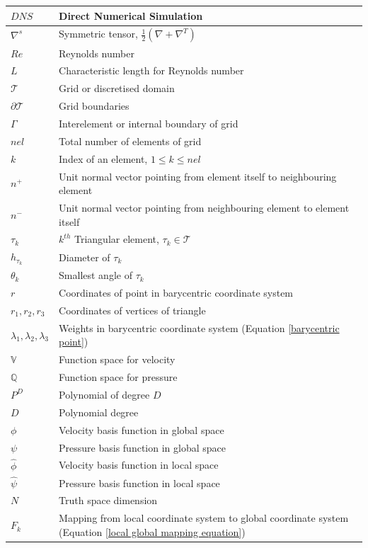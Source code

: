 \documentclass[a4paper,openany]{book}
\begin{document}
\begin{longtable}{| p{} | p{} |}
\hline
$DNS$ & Direct Numerical Simulation\\
\hline
$\nabla^s$ & Symmetric tensor, $\frac{1}{2} (\nabla + \nabla^T)$\\
\hline
$Re$ & Reynolds number\\
\hline
$L$ & Characteristic length for Reynolds number\\
\hline
$\mathcal{T}$ & Grid or discretised domain\\
\hline
$\partial \mathcal{T}$ & Grid boundaries\\
\hline
$\Gamma$ & Interelement or internal boundary of grid\\
\hline
$nel$ & Total number of elements of grid\\
\hline
$k$ & Index of an element, $1\leq k \leq nel$\\
\hline
$n^+$ & Unit normal vector pointing from element itself to neighbouring element\\
\hline
$n^-$ & Unit normal vector pointing from neighbouring element to element itself \\
\hline
$\tau_k$ & $k^{th}$ Triangular element, $\tau_k \in \mathcal{T}$\\
\hline
$h_{\tau_k}$ & Diameter of $\tau_k$\\
\hline
$\theta_k$ & Smallest angle of $\tau_k$\\ 
\hline
$r$ & Coordinates of point in barycentric coordinate system\\
\hline
$r_1, r_2, r_3$ & Coordinates of vertices of triangle\\
\hline
$\lambda_1, \lambda_2, \lambda_3$ & Weights in barycentric coordinate system (Equation \ref{barycentric point})\\
\hline
$\mathbb{V}$ & Function space for velocity\\
\hline
$\mathbb{Q}$ & Function space for pressure\\
\hline
$P^D$ & Polynomial of degree $D$\\
\hline
$D$ & Polynomial degree\\
\hline
$\phi$ & Velocity basis function in global space\\
\hline
$\psi$ & Pressure basis function in global space\\
\hline
$\hat{\phi}$ & Velocity basis function in local space\\
\hline
$\hat{\psi}$ & Pressure basis function in local space\\
\hline
$N$ & Truth space dimension\\
\hline
$F_k$ & Mapping from local coordinate system to global coordinate system (Equation \eqref{local global mapping equation})\\

\end{longtable}
\end{document}

